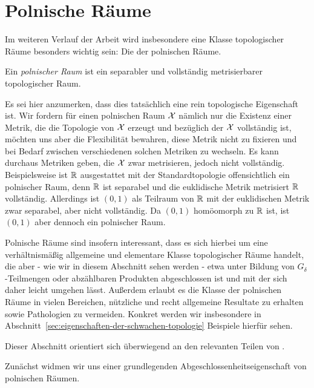 \documentclass[../main/main.tex]{subfiles}
\begin{document}
	
	\section{Polnische Räume}
	
	Im weiteren Verlauf der Arbeit wird insbesondere eine Klasse topologischer Räume besonders wichtig sein: Die der polnischen Räume.
	
	\begin{Definition}
		Ein \emph{polnischer Raum} ist ein separabler und vollständig metrisierbarer topologischer Raum.
	\end{Definition}

	\begin{Bemerkung}
		Es sei hier anzumerken, dass dies tatsächlich eine rein topologische Eigenschaft ist. Wir fordern für einen polnischen Raum $\mathcal{X}$ nämlich nur die Existenz einer Metrik,
		die die Topologie von $\mathcal{X}$ erzeugt und bezüglich der $\mathcal{X}$ vollständig ist, möchten uns aber die Flexibilität
		bewahren, diese Metrik nicht zu fixieren und bei Bedarf zwischen verschiedenen solchen Metriken
		zu wechseln. Es kann durchaus Metriken geben, die $\mathcal{X}$ zwar metrisieren, jedoch nicht vollständig.
		Beispielsweise ist $\mathbb{R}$ ausgestattet mit der Standardtopologie offensichtlich ein polnischer Raum,
		denn $\mathbb{R}$ ist separabel und die euklidische Metrik metrisiert $\mathbb{R}$ vollständig. 
		Allerdings ist $(0, 1)$ als Teilraum von $\mathbb{R}$ mit der euklidischen Metrik zwar separabel, aber nicht vollständig.
		Da $(0, 1)$ homöomorph zu $\mathbb{R}$ ist, ist $(0, 1)$ aber dennoch ein polnischer Raum.
	\end{Bemerkung}

	Polnische Räume sind insofern interessant, dass es sich hierbei um eine verhältnismäßig allgemeine und elementare Klasse topologischer Räume handelt, die aber - wie wir in diesem Abschnitt sehen werden - 
	etwa unter Bildung von $G_\delta$-Teilmengen oder abzählbaren Produkten abgeschlossen ist und mit der sich daher leicht umgehen lässt. Außerdem erlaubt es die Klasse der polnischen Räume in vielen Bereichen, 
	nützliche und recht allgemeine Resultate zu erhalten sowie Pathologien zu vermeiden. Konkret werden wir insbesondere in Abschnitt~\ref{sec:eigenschaften-der-schwachen-topologie} Beispiele hierfür sehen.
	
	Dieser Abschnitt orientiert sich überwiegend an den relevanten Teilen von \cite[Kapitel 4.14]{Simon.2015}. 
	
	Zunächst widmen wir uns einer grundlegenden Abgeschlossenheitseigenschaft von polnischen Räumen.
	
\end{document}
